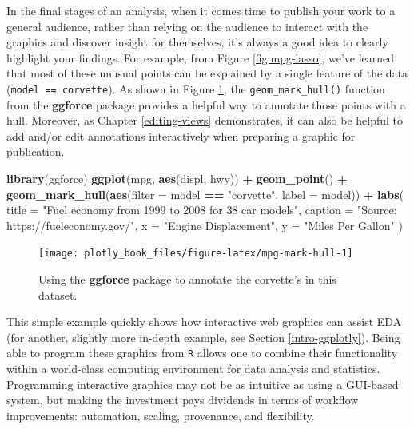 \documentclass[
  12pt,
]{krantz}
\newenvironment{Shaded}{\begin{snugshade}}{\end{snugshade}}
\newcommand{\DataTypeTok}[1]{\textcolor[rgb]{0.13,0.29,0.53}{#1}}
\newcommand{\KeywordTok}[1]{\textcolor[rgb]{0.13,0.29,0.53}{\textbf{#1}}}
\newcommand{\NormalTok}[1]{#1}
\newcommand{\OperatorTok}[1]{\textcolor[rgb]{0.81,0.36,0.00}{\textbf{#1}}}
\newcommand{\StringTok}[1]{\textcolor[rgb]{0.31,0.60,0.02}{#1}}
\begin{document}
In the final stages of an analysis, when it comes time to publish your work to a general audience, rather than relying on the audience to interact with the graphics and discover insight for themselves, it's always a good idea to clearly highlight your findings. For example, from Figure \ref{fig:mpg-lasso}, we've learned that most of these unusual points can be explained by a single feature of the data (\texttt{model\ ==\ \textquotesingle{}corvette\textquotesingle{}}). As shown in Figure \ref{fig:mpg-mark-hull}, the \texttt{geom\_mark\_hull()} function from the \textbf{ggforce} package provides a helpful way to annotate those points with a hull. Moreover, as Chapter \ref{editing-views} demonstrates, it can also be helpful to add and/or edit annotations interactively when preparing a graphic for publication.

\begin{Shaded}
\begin{Highlighting}[]
\KeywordTok{library}\NormalTok{(ggforce)}
\KeywordTok{ggplot}\NormalTok{(mpg, }\KeywordTok{aes}\NormalTok{(displ, hwy)) }\OperatorTok{+}\StringTok{ }
\StringTok{  }\KeywordTok{geom_point}\NormalTok{() }\OperatorTok{+}
\StringTok{  }\KeywordTok{geom_mark_hull}\NormalTok{(}\KeywordTok{aes}\NormalTok{(}\DataTypeTok{filter =}\NormalTok{ model }\OperatorTok{==}\StringTok{ "corvette"}\NormalTok{, }\DataTypeTok{label =}\NormalTok{ model)) }\OperatorTok{+}
\StringTok{  }\KeywordTok{labs}\NormalTok{(}
    \DataTypeTok{title =} \StringTok{"Fuel economy from 1999 to 2008 for 38 car models"}\NormalTok{,}
    \DataTypeTok{caption =} \StringTok{"Source: https://fueleconomy.gov/"}\NormalTok{,}
    \DataTypeTok{x =} \StringTok{"Engine Displacement"}\NormalTok{, }
    \DataTypeTok{y =} \StringTok{"Miles Per Gallon"}
\NormalTok{  )}
\end{Highlighting}
\end{Shaded}

\begin{figure}[H]

{\centering \texttt{[image: plotly\_book\_files/figure-latex/mpg-mark-hull-1]} 

}

\caption{Using the \textbf{ggforce} package to annotate the corvette's in this dataset.}\label{fig:mpg-mark-hull}
\end{figure}

This simple example quickly shows how interactive web graphics can assist EDA (for another, slightly more in-depth example, see Section \ref{intro-ggplotly}). Being able to program these graphics from \texttt{R} allows one to combine their functionality within a world-class computing environment for data analysis and statistics. Programming interactive graphics may not be as intuitive as using a GUI-based system, but making the investment pays dividends in terms of workflow improvements: automation, scaling, provenance, and flexibility.
\end{document}
